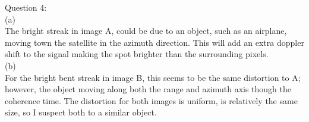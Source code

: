 \documentclass{homework}
\begin{document}
Question 4: \\

(a) \\
The bright streak in image A, could be due to an object, such as an airplane, moving town the satellite in the azimuth direction. This will add an extra doppler shift to the signal making the spot brighter than the surrounding pixels. \\

(b) \\
For the bright bent streak in image B, this seems to be the same distortion to A; however, the object moving along both the range and azimuth axis though the coherence time. The distortion for both images is uniform, is relatively the same size, so I suspect both to a similar object.  

\printbibliography
\end{document}
